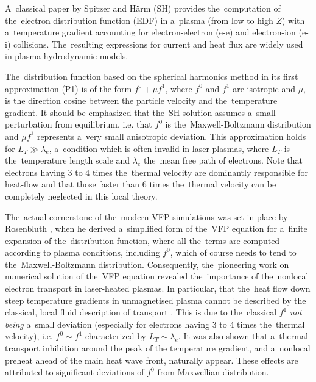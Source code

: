 \documentclass[
 aps,
 jmp,
 amsmath,amssymb,
 twocolumn,
]{revtex4-1}
\newcommand{\mfpe}{\lambda_e}
\newcommand{\Zbar}{Z}
\begin{document}
A~classical paper by Spitzer and H\"arm (SH) 
\cite{SpitzerHarm_PR1953} provides the~computation of 
the~electron distribution function (EDF) in a~plasma (from low to high $\Zbar$)
with a~temperature gradient accounting for electron-electron (e-e) and 
electron-ion (e-i) collisions.
The~resulting expressions for current and heat flux are widely used in plasma 
hydrodynamic models.

The~distribution function based on the spherical harmonics method in 
its first approximation (P1) \cite{Jeans_MNRAS1917} is of the form 
$f^0+\mu f^1$, where $f^0$ and $f^1$ 
are isotropic and $\mu$, is the direction cosine between the particle 
velocity and the~temperature gradient. It should be emphasized that
the~SH solution assumes a~small perturbation from equilibrium, i.e. that 
$f^0$ is the~Maxwell-Boltzmann distribution and $\mu f^1$ represents 
a~very small anisotropic deviation. 
This approximation holds for $L_T\gg\mfpe$, 
a~condition which is often invalid in laser plasmas, 
where $L_T$ is the~temperature length scale and $\mfpe$ 
the~mean free path of electrons. Note that electrons having
3 to 4 times the~thermal velocity are dominantly responsible for heat-flow
and that those faster than 6 times the~thermal velocity can be completely 
neglected in this local theory.

The~actual cornerstone of the~modern VFP simulations was set in place
by Rosenbluth \cite{Rosenbluth_PR1957}, when he derived a~simplified form 
of the~VFP equation for a~finite expansion of the~distribution function,
where all the~terms are computed according to plasma conditions, including
$f^0$, which of course needs to tend to the~Maxwell-Boltzmann distribution.
Consequently, the~pioneering work on numerical solution of the~VFP equation
\cite{Bell_1981_83, Matte_1982_86} revealed the~importance of the~nonlocal
electron transport in laser-heated plasmas. 
In particular, that the~heat flow down steep temperature gradients in 
unmagnetised plasma cannot be described by the classical, local fluid
description of transport \cite{SpitzerHarm_PR1953, Braginskii_1965_3}.
This is due to the~classical $f^1$ \textit{not being} a~small deviation 
(especially for electrons having 3 to 4 times the~thermal velocity), 
i.e. $f^0\sim f^1$ characterized by $L_T\sim\mfpe$.
It was also shown that a~thermal transport inhibition \cite{Bell_1981_83} 
around the peak of the temperature gradient, and a~nonlocal preheat 
ahead of the main heat wave front, naturally appear. 
These effects are attributed to significant deviations 
of $f^0$ from Maxwellian distribution.
\end{document}
